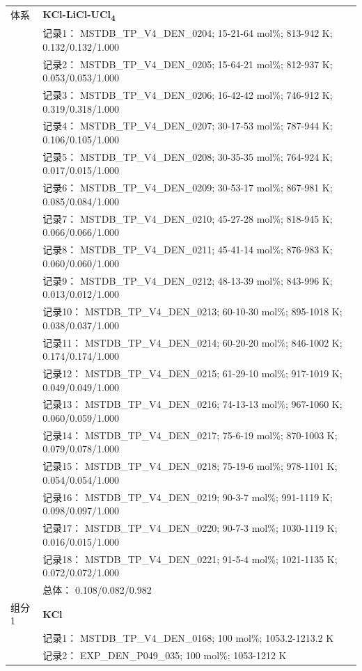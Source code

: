 \documentclass[12pt]{article}
\begin{document}
{\begin{longtable}[]{@{}
  >{\raggedright\arraybackslash}p{}
  >{\raggedright\arraybackslash}p{}@{}}
\midrule
体系 & \textbf{KCl-LiCl-UCl\textsubscript{4}} \\
 & 记录1： MSTDB\_TP\_V4\_DEN\_0204; 15-21-64 mol\%; 813-942 K; 0.132/0.132/1.000 \\
 & 记录2： MSTDB\_TP\_V4\_DEN\_0205; 15-64-21 mol\%; 812-937 K; 0.053/0.053/1.000 \\
 & 记录3： MSTDB\_TP\_V4\_DEN\_0206; 16-42-42 mol\%; 746-912 K; 0.319/0.318/1.000 \\
 & 记录4： MSTDB\_TP\_V4\_DEN\_0207; 30-17-53 mol\%; 787-944 K; 0.106/0.105/1.000 \\
 & 记录5： MSTDB\_TP\_V4\_DEN\_0208; 30-35-35 mol\%; 764-924 K; 0.017/0.015/1.000 \\
 & 记录6： MSTDB\_TP\_V4\_DEN\_0209; 30-53-17 mol\%; 867-981 K; 0.085/0.084/1.000 \\
 & 记录7： MSTDB\_TP\_V4\_DEN\_0210; 45-27-28 mol\%; 818-945 K; 0.066/0.066/1.000 \\
 & 记录8： MSTDB\_TP\_V4\_DEN\_0211; 45-41-14 mol\%; 876-983 K; 0.060/0.060/1.000 \\
 & 记录9： MSTDB\_TP\_V4\_DEN\_0212; 48-13-39 mol\%; 843-996 K; 0.013/0.012/1.000 \\
 & 记录10： MSTDB\_TP\_V4\_DEN\_0213; 60-10-30 mol\%; 895-1018 K; 0.038/0.037/1.000 \\
 & 记录11： MSTDB\_TP\_V4\_DEN\_0214; 60-20-20 mol\%; 846-1002 K; 0.174/0.174/1.000 \\
 & 记录12： MSTDB\_TP\_V4\_DEN\_0215; 61-29-10 mol\%; 917-1019 K; 0.049/0.049/1.000 \\
 & 记录13： MSTDB\_TP\_V4\_DEN\_0216; 74-13-13 mol\%; 967-1060 K; 0.060/0.059/1.000 \\
 & 记录14： MSTDB\_TP\_V4\_DEN\_0217; 75-6-19 mol\%; 870-1003 K; 0.079/0.078/1.000 \\
 & 记录15： MSTDB\_TP\_V4\_DEN\_0218; 75-19-6 mol\%; 978-1101 K; 0.054/0.054/1.000 \\
 & 记录16： MSTDB\_TP\_V4\_DEN\_0219; 90-3-7 mol\%; 991-1119 K; 0.098/0.097/1.000 \\
 & 记录17： MSTDB\_TP\_V4\_DEN\_0220; 90-7-3 mol\%; 1030-1119 K; 0.016/0.015/1.000 \\
 & 记录18： MSTDB\_TP\_V4\_DEN\_0221; 91-5-4 mol\%; 1021-1135 K; 0.072/0.072/1.000 \\
 & 总体： 0.108/0.082/0.982  \\

组分 1  & \textbf{KCl} \\
 & 记录1： MSTDB\_TP\_V4\_DEN\_0168; 100 mol\%; 1053.2-1213.2 K \\
 & 记录2： EXP\_DEN\_P049\_035; 100 mol\%; 1053-1212 K  \\


\end{longtable}}
\end{document}
